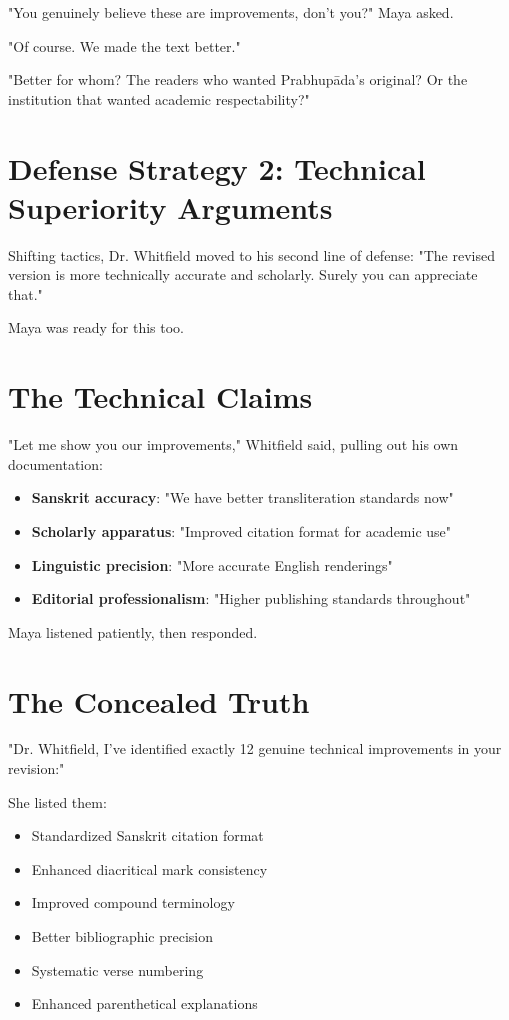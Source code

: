 \documentclass[11pt,twoside]{book}
\begin{document}
"You genuinely believe these are improvements, don't you?" Maya asked.

"Of course. We made the text better."

"Better for whom? The readers who wanted Prabhupāda's original? Or the institution that wanted academic respectability?"
\section*{Defense Strategy 2: Technical Superiority Arguments}
\label{sec:org3718246}

Shifting tactics, Dr. Whitfield moved to his second line of defense: "The revised version is more technically accurate and scholarly. Surely you can appreciate that."

Maya was ready for this too.
\section*{The Technical Claims}
\label{sec:org1568583}

"Let me show you our improvements," Whitfield said, pulling out his own documentation:

\begin{itemize}
\item \textbf{\textbf{Sanskrit accuracy}}: "We have better transliteration standards now"
\item \textbf{\textbf{Scholarly apparatus}}: "Improved citation format for academic use"
\item \textbf{\textbf{Linguistic precision}}: "More accurate English renderings"
\item \textbf{\textbf{Editorial professionalism}}: "Higher publishing standards throughout"
\end{itemize}

Maya listened patiently, then responded.
\section*{The Concealed Truth}
\label{sec:org480fb6e}

"Dr. Whitfield, I've identified exactly 12 genuine technical improvements in your revision:"

She listed them:
\begin{itemize}
\item Standardized Sanskrit citation format
\item Enhanced diacritical mark consistency
\item Improved compound terminology
\item Better bibliographic precision
\item Systematic verse numbering
\item Enhanced parenthetical explanations
\end{itemize}
\end{document}
